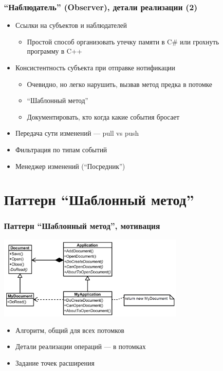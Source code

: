 \documentclass{../../slides-style}
\begin{document}
    \begin{frame}
        \frametitle{``Наблюдатель'' (Observer), детали реализации (2)}
        \begin{itemize}
            \item Ссылки на субъектов и наблюдателей
            \begin{itemize}
                \item Простой способ организовать утечку памяти в C\# или грохнуть программу в C++
            \end{itemize}
            \item Консистентность субъекта при отправке нотификации
            \begin{itemize}
                \item Очевидно, но легко нарушить, вызвав метод предка в потомке
                \item ``Шаблонный метод''
                \item Документировать, кто когда какие события бросает
            \end{itemize}
            \item Передача сути изменений --- pull vs push
            \item Фильтрация по типам событий
            \item Менеджер изменений (``Посредник'')
        \end{itemize}
    \end{frame}

    \section{Паттерн ``Шаблонный метод''}

    \begin{frame}
        \frametitle{Паттерн ``Шаблонный метод'', мотивация}
        \begin{center}
            \includegraphics[width=0.7\textwidth]{templateMethodMotivation.png}
        \end{center}
        \begin{itemize}
            \item Алгоритм, общий для всех потомков
            \item Детали реализации операций --- в потомках
            \item Задание точек расширения
        \end{itemize}
    \end{frame}
\end{document}
